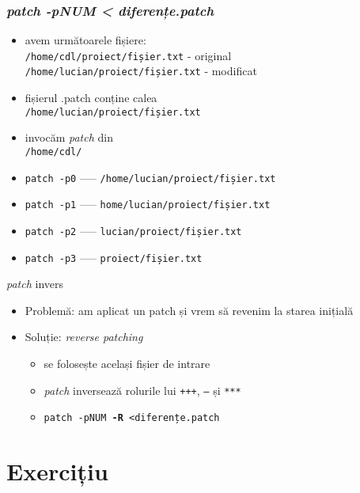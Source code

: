 \documentclass{beamer}
\begin{document}
\begin{frame}
  \frametitle{\textit{patch -pNUM < diferențe.patch}}
  \begin{itemize}[<+->]
  \item avem următoarele fișiere:                        \\
    \texttt{/home/cdl/proiect/fișier.txt} - original     \\
    \texttt{/home/lucian/proiect/fișier.txt} - modificat \\
  \item fișierul .patch conține calea \\
    \texttt{/home/lucian/proiect/fișier.txt}
  \item invocăm \textit{patch} din \\
    \texttt{/home/cdl/}
  \item \texttt{patch -p0} ––– \texttt{/home/lucian/proiect/fișier.txt}
  \item \texttt{patch -p1} ––– \texttt{home/lucian/proiect/fișier.txt}
  \item \texttt{patch -p2} ––– \texttt{lucian/proiect/fișier.txt}
  \item \texttt{patch -p3} ––– \texttt{proiect/fișier.txt}
  \end{itemize}
\end{frame}


\begin{frame}{\textit{patch} invers}
  \begin{itemize}[<+->]
  \item Problemă: am aplicat un patch și vrem să revenim la starea inițială
  \item Soluție: \textit{reverse patching}
    \begin{itemize}
    \item se folosește același fișier de intrare
    \item \textit{patch} inversează rolurile lui \texttt{+++}, \texttt{---} și \texttt{***}
    \item \texttt{patch -pNUM \textbf{-R} \textless diferențe.patch}
    \end{itemize}
  \end{itemize}
\end{frame}

\section{Exercițiu}
\frame{\tableofcontents[currentsection]}
\end{document}
